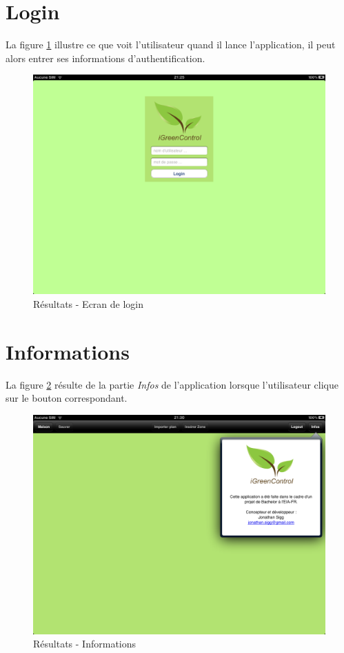 \section{Login} %
\label{sec:login}
La figure \ref{gra:res02} illustre ce que voit l'utilisateur quand il lance l'application, il peut alors entrer ses informations d'authentification.
\begin{figure}[H]
     	\centering
     	\includegraphics[width=\textwidth]{00_media/07_02.PNG}
     	\caption{Résultats - Ecran de login}
     	\label{gra:res02}
 \end{figure} 

\clearpage

\section{Informations} %
\label{sec:informations}
La figure \ref{gra:res03} résulte de la partie \emph{Infos} de l'application lorsque l'utilisateur clique sur le bouton correspondant.
\begin{figure}[H]
     	\centering
     	\includegraphics[width=\textwidth]{00_media/07_03.PNG}
     	\caption{Résultats - Informations}
     	\label{gra:res03}
 \end{figure} 

